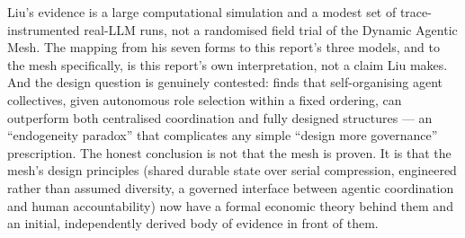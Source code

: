 \begin{cautionbox}
Liu's evidence is a large computational simulation and a modest set of trace-instrumented real-LLM runs, not a randomised field trial of the Dynamic Agentic Mesh. The mapping from his seven forms to this report's three models, and to the mesh specifically, is this report's own interpretation, not a claim Liu makes. And the design question is genuinely contested: \textcite{Dochkina2026} finds that self-organising agent collectives, given autonomous role selection within a fixed ordering, can outperform both centralised coordination and fully designed structures --- an ``endogeneity paradox'' that complicates any simple ``design more governance'' prescription. The honest conclusion is not that the mesh is proven. It is that the mesh's design principles (shared durable state over serial compression, engineered rather than assumed diversity, a governed interface between agentic coordination and human accountability) now have a formal economic theory behind them and an initial, independently derived body of evidence in front of them.
\end{cautionbox}

